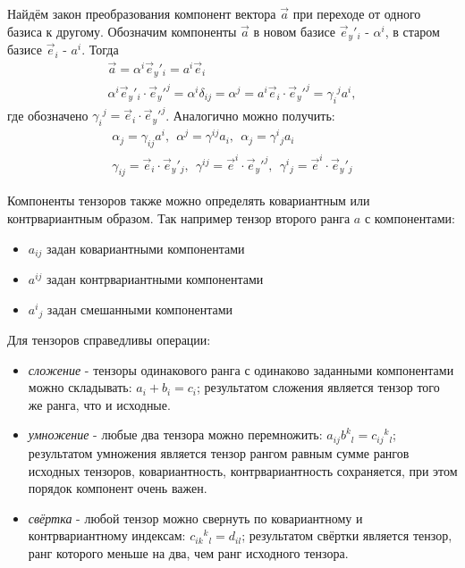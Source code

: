 Найдём закон преобразования компонент вектора \( \vec{a} \) при переходе от
одного базиса к другому. Обозначим компоненты \( \vec{a} \) в новом базисе
\( \vec{e}_y{'}_{i} \) - \( \alpha^i \), в старом базисе \( \vec{e}_{i} \) -
\( a^i \). Тогда
\begin{gather*}
    \vec{a} = \alpha^i\vec{e}_y{'}_{i} = a^i\vec{e}_{i} \\
    \alpha^i \vec{e}_y{'}_{i}\cdot \vec{e}_y{'}^{j} = \alpha^i \delta_{ij} =
    \alpha^j = a^i\vec{e}_{i}\cdot \vec{e}_y{'}^{j} = \gamma_i{}^j a^i,
\end{gather*}
где обозначено \( \gamma_i{}^j = \vec{e}_{i}\cdot \vec{e}_y{'}^{j} \).
Аналогично можно получить:
\begin{gather*}
    \alpha_j =
    \gamma_{ij} a^i,~~
    \alpha^j =
    \gamma^{ij} a_i,~~
    \alpha_j =
    \gamma^i{}_j  a_i \\
    \gamma_{ij} = \vec{e}_{i}\cdot \vec{e}_y{'}_{j},~~
    \gamma^{ij} = \vec{e}^{i}\cdot \vec{e}_y{'}^{j},~~    
    \gamma^i{}_j = \vec{e}^{i}\cdot \vec{e}_y{'}_{j}
\end{gather*}
    
Компоненты тензоров также можно определять ковариантным или контрвариантным
 образом. Так например тензор второго ранга \( a \) с компонентами:
\begin{itemize}
    \item \( a_{ij} \) задан ковариантными компонентами
    \item \( a^{ij} \) задан контрвариантными компонентами
    \item \( a^i{}_j \) задан смешанными компонентами
\end{itemize}

Для тензоров справедливы операции:
\begin{itemize}
    \item \emph{сложение} - тензоры одинакового ранга с одинаково заданными
    компонентами можно складывать: \( a_i + b_i = c_i \); результатом сложения
    является тензор того же ранга, что и исходные.
    \item \emph{умножение} - любые два тензора можно перемножить:
    \( a_{ij}b^k{}_l = c_{ij}{}^k{}_l \); результатом умножения является тензор
    рангом равным сумме рангов  исходных тензоров, ковариантность,
    контрвариантность сохраняется, при этом порядок компонент очень важен.
    \item \emph{свёртка} - любой тензор можно свернуть по ковариантному и
    контрвариантному индексам: \( c_{ik}{}^k{}_l = d_{il}  \); результатом
    свёртки является тензор, ранг которого меньше на два, чем ранг исходного
    тензора.
\end{itemize}   

